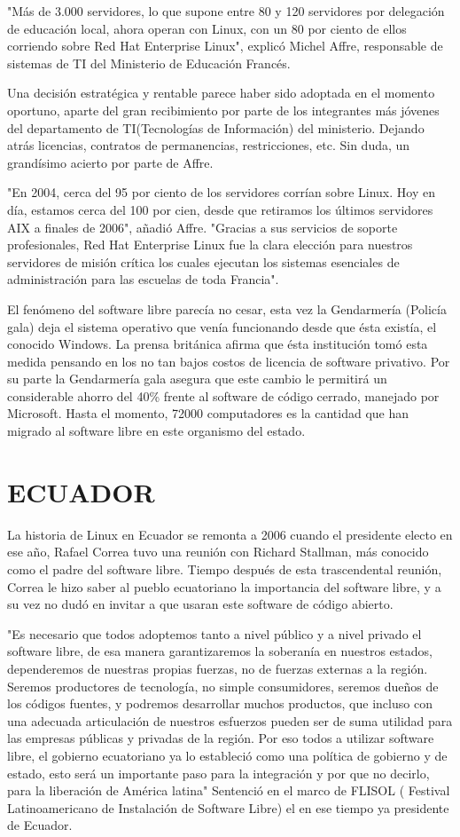 "Más de 3.000 servidores, lo que supone entre 80 y 120 servidores por delegación de educación local, ahora operan con Linux, con un 80 por ciento de ellos corriendo sobre Red Hat 
Enterprise Linux", explicó Michel Affre, responsable de sistemas de TI del Ministerio de Educación Francés.

Una decisión estratégica y rentable parece haber sido adoptada en el momento oportuno, aparte del gran recibimiento por parte de los integrantes más jóvenes del departamento de 
TI(Tecnologías de Información) del ministerio. Dejando atrás licencias, contratos de permanencias, restricciones, etc. Sin duda, un grandísimo acierto por parte de Affre.

"En 2004, cerca del 95 por ciento de los servidores corrían sobre Linux. Hoy en día, estamos cerca del 100 por cien, desde que retiramos los últimos servidores AIX a finales de 
2006", añadió Affre. "Gracias a sus servicios de soporte profesionales, Red Hat Enterprise Linux fue la clara elección para nuestros servidores de misión crítica los cuales 
ejecutan los sistemas esenciales de administración para las escuelas de toda Francia".

El fenómeno del software libre parecía no cesar, esta vez la Gendarmería (Policía gala) deja el sistema operativo que venía funcionando desde que ésta existía, el conocido 
Windows. La prensa británica afirma que ésta institución tomó esta medida pensando en los no tan bajos costos de licencia de software privativo. Por su parte la Gendarmería gala 
asegura que este cambio le permitirá un considerable ahorro del 40\% frente al software de código cerrado, manejado por Microsoft. Hasta el momento, 72000 computadores es la 
cantidad que han migrado al software libre en este organismo del estado.


\section*{ECUADOR}
La historia de Linux en Ecuador se remonta a 2006 cuando el presidente electo en ese año, Rafael Correa tuvo una reunión con Richard Stallman, más conocido como el padre del 
software libre. Tiempo después de esta trascendental reunión, Correa le hizo saber al pueblo ecuatoriano la importancia del software libre, y a su vez no dudó en invitar a que 
usaran este software de código abierto.

"Es necesario que todos adoptemos tanto a nivel público y a nivel privado el software libre, de esa manera garantizaremos la soberanía en nuestros estados, dependeremos de 
nuestras propias fuerzas, no de fuerzas externas a la región. Seremos productores de tecnología, no simple consumidores, seremos dueños de los códigos fuentes, y podremos 
desarrollar muchos productos, que incluso con una
adecuada articulación de nuestros esfuerzos pueden ser de suma utilidad para las empresas públicas y privadas de la región. Por eso todos a utilizar software libre, el gobierno 
ecuatoriano ya lo estableció como una política de gobierno y de estado, esto será un importante paso para la integración y por que no decirlo, para la liberación de América 
latina" Sentenció en el marco de FLISOL ( Festival Latinoamericano de Instalación de Software Libre) el en ese tiempo ya presidente de Ecuador.

